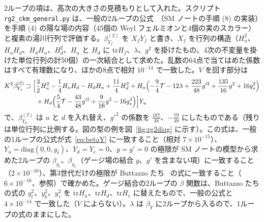 \documentclass[a4paper,10pt]{ltjsarticle}
\newcommand{\tr}{\mathrm{tr}}
\begin{document}
2ループの項は、高次の大きさの見積もりとして入れた。スクリプト \texttt{rg2\_ckm\_general.py} は、一般の2ループの公式~\cite{luo03}（SM ノートの手順 (8) の実装）を手順 (4) の陽な場の内容（45個の Weyl フェルミオンと4個の実のスカラー）と複素の湯川行列で評価する。$\beta^{(2)}_{Y_f}$ を $X_fY_f$ と書き、$X_f$ を行列の構造（$H_u^2$、$H_uH_d$、$H_dH_u$、$H_d^2$、$H_u$ と $H_d$ に $\tr H_f$、$\lambda$、$g^2$ を掛けたもの、4次の不変量を掛けた単位行列の計50個）の一次結合として求めた。乱数の64点で当てはめた係数はすべて有理数になり、ほかの8点で相対 $10^{-14}$ で一致した。$V$ を回す部分は
\begin{equation}
\begin{aligned}
K^2\beta^{(2)}_{Y_u}\supset\Bigl[&\frac32H_u^2-\frac14H_uH_d-H_dH_u+\frac{11}4H_d^2+H_u\Bigl(-\frac94\mathcal T-12\lambda+\frac{223}{48}g'^2+\frac{135}{16}g^2+16g_s^2\Bigr)\\
&+H_d\Bigl(\frac54\mathcal T-\frac{43}{48}g'^2+\frac9{16}g^2-16g_s^2\Bigr)\Bigr]Y_u
\end{aligned}
\label{eq:betaY2}
\end{equation}
で、$\beta^{(2)}_{Y_d}$ は $u$ と $d$ を入れ替え、$g'^2$ の係数を $\frac{187}{48}$、$-\frac{79}{48}$ にしたものである（残りは単位行列に比例する。図の型の例を図~\ref{fig:rg2diag} に示す）。この式は、一般の1ループの公式が式~\eqref{eq:betaY} に一致すること（相対 $7\times10^{-15}$）、$Y_u=\mathrm{diag}(0,0,y_t)$、$Y_d=Y_e=0$、$g=g'=0$ の極限が SM ノートの模型から求めた2ループの $\beta_{y_t}$、$\beta_{g_s}$（ゲージ場の結合 $g$、$g'$ を含まない項）に一致すること（$2\times10^{-16}$）、第3世代だけの極限が Buttazzo たち~\cite{buttazzo13} の式に一致すること（$6\times10^{-16}$、参照）で確かめた。ゲージ結合の2ループの $\beta$ 関数は、Buttazzo たちの式の $y_t^2$、$y_b^2$、$y_\tau^2$ を $\tr H_u$、$\tr H_d$、$\tr H_e$ に替えたもので、一般の公式と $4\times10^{-14}$ で一致した（$V$ によらない）。$\lambda$ は $\beta_Y$ に2ループから入るので、1ループの式のままにした。
\end{document}

